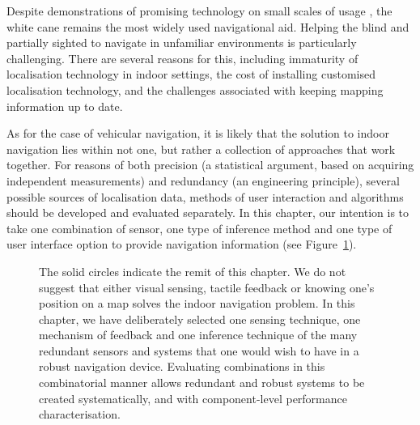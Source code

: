 Despite demonstrations of promising technology on small scales of usage \citep{blindSquare,maidenbaum2013increasing,liu2010video}, the white cane remains the most widely used navigational aid. Helping the blind and partially sighted to navigate in unfamiliar environments is particularly challenging. There are several reasons for this, including immaturity of localisation technology in indoor settings, the cost of installing customised localisation technology, and the challenges associated with keeping mapping information up to date. 

As for the case of vehicular navigation, it is likely that the solution to indoor navigation lies within not one, but rather a collection of approaches that work together.  For reasons of both precision (a statistical argument, based on acquiring independent measurements) and redundancy (an engineering principle), several possible sources of localisation data, methods of user interaction and algorithms should be developed and evaluated separately.  In this chapter, our intention is to take one combination of sensor, one type of inference method and one type of user interface option to provide navigation information (see Figure~\ref{fig:techremit}).

\begin{figure}[]
\centering
{}
\caption{The solid circles indicate the remit of this chapter. We do not suggest that either visual sensing, tactile feedback or knowing one's position on a map solves the indoor navigation problem. In this chapter, we have deliberately selected one sensing technique, one mechanism of feedback and one inference technique of the many redundant sensors and systems that one would wish to have in a robust navigation device. Evaluating combinations in this combinatorial manner allows redundant and robust systems to be created systematically, and with component-level performance characterisation.}
\label{fig:techremit}
\end{figure}



